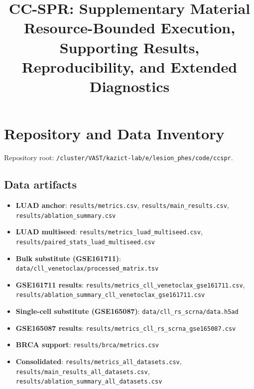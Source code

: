 \documentclass[11pt]{article}
\title{CC-SPR: Supplementary Material\\[6pt]
\large Resource-Bounded Execution, Supporting Results, Reproducibility, and Extended Diagnostics}
\author{}
\date{}
\begin{document}
\maketitle

\tableofcontents
\newpage

\section{Repository and Data Inventory}
\label{sec:inventory}

Repository root: \texttt{/cluster/VAST/kazict-lab/e/lesion\_phes/code/ccspr}.

\subsection{Data artifacts}
\begin{itemize}[leftmargin=1.5em]
\item \textbf{LUAD anchor}: \texttt{results/metrics.csv}, \texttt{results/main\_results.csv}, \texttt{results/ablation\_summary.csv}
\item \textbf{LUAD multiseed}: \texttt{results/metrics\_luad\_multiseed.csv}, \texttt{results/paired\_stats\_luad\_multiseed.csv}
\item \textbf{Bulk substitute (GSE161711)}: \texttt{data/cll\_venetoclax/processed\_matrix.tsv}
\item \textbf{GSE161711 results}: \texttt{results/metrics\_cll\_venetoclax\_gse161711.csv}, \texttt{results/ablation\_summary\_cll\_venetoclax\_gse161711.csv}
\item \textbf{Single-cell substitute (GSE165087)}: \texttt{data/cll\_rs\_scrna/data.h5ad}
\item \textbf{GSE165087 results}: \texttt{results/metrics\_cll\_rs\_scrna\_gse165087.csv}
\item \textbf{BRCA support}: \texttt{results/brca/metrics.csv}
\item \textbf{Consolidated}: \texttt{results/metrics\_all\_datasets.csv}, \texttt{results/main\_results\_all\_datasets.csv}, \texttt{results/ablation\_summary\_all\_datasets.csv}
\end{itemize}
\end{document}
